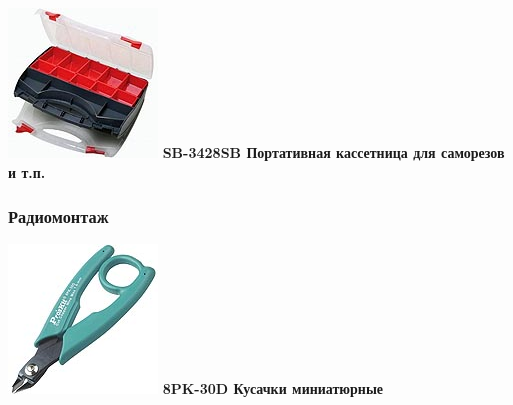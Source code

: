 \documentclass{magazine}
\begin{document}
{\begin{multicols}{2}
\noindent\includegraphics[width=\columnwidth]{fig/00/pros/SB-3428SB.jpg}
\textbf{SB-3428SB Портативная кассетница для саморезов и т.п.}

\subsubsection{Радиомонтаж}

\noindent\includegraphics[width=\columnwidth]{fig/00/pros/8PK-30D.jpg}
\textbf{8PK-30D Кусачки миниатюрные}


\end{multicols}}
\end{document}
